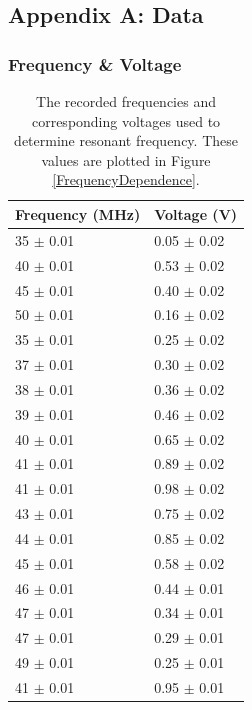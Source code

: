 \documentclass[a4paper]{article}
\begin{document}
\subsection{Appendix A: Data}

\subsubsection{Frequency \& Voltage}

\begin{table}[H]
  \caption{The recorded frequencies and corresponding voltages used to determine
    resonant frequency. These values are plotted in Figure
    \ref{FrequencyDependence}.}
  \begin{center}
    \begin{tabular}{|l|l|}
      \hline
      Frequency (\si{\mega\hertz}) & Voltage (\si{\volt}) \\
      \hline
      35 \( \pm \) 0.01 & 0.05  \( \pm \) 0.02 \\
      40 \( \pm \) 0.01 & 0.53  \( \pm \) 0.02 \\
      45 \( \pm \) 0.01 & 0.40  \( \pm \) 0.02 \\
      50 \( \pm \) 0.01 & 0.16  \( \pm \) 0.02 \\
      35 \( \pm \) 0.01 & 0.25  \( \pm \) 0.02 \\
      37 \( \pm \) 0.01 & 0.30  \( \pm \) 0.02 \\
      38 \( \pm \) 0.01 & 0.36  \( \pm \) 0.02 \\
      39 \( \pm \) 0.01 & 0.46  \( \pm \) 0.02 \\
      40 \( \pm \) 0.01 & 0.65  \( \pm \) 0.02 \\
      41 \( \pm \) 0.01 & 0.89  \( \pm \) 0.02 \\
      41 \( \pm \) 0.01 & 0.98  \( \pm \) 0.02 \\
      43 \( \pm \) 0.01 & 0.75  \( \pm \) 0.02 \\
      44 \( \pm \) 0.01 & 0.85  \( \pm \) 0.02 \\
      45 \( \pm \) 0.01 & 0.58  \( \pm \) 0.02 \\
      46 \( \pm \) 0.01 & 0.44  \( \pm \) 0.01 \\
      47 \( \pm \) 0.01 & 0.34  \( \pm \) 0.01 \\
      47 \( \pm \) 0.01 & 0.29  \( \pm \) 0.01 \\
      49 \( \pm \) 0.01 & 0.25  \( \pm \) 0.01 \\
      41 \( \pm \) 0.01 & 0.95  \( \pm \) 0.01 \\

\end{tabular}
\end{center}
\end{table}
\end{document}
